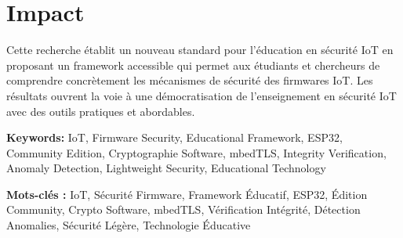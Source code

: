 \section*{Impact}

Cette recherche établit un nouveau standard pour l'éducation en sécurité IoT en proposant un framework accessible qui permet aux étudiants et chercheurs de comprendre concrètement les mécanismes de sécurité des firmwares IoT. Les résultats ouvrent la voie à une démocratisation de l'enseignement en sécurité IoT avec des outils pratiques et abordables.

\textbf{Keywords:} IoT, Firmware Security, Educational Framework, ESP32, Community Edition, Cryptographie Software, mbedTLS, Integrity Verification, Anomaly Detection, Lightweight Security, Educational Technology

\vfill

\begin{center}
\textbf{Mots-clés :} IoT, Sécurité Firmware, Framework Éducatif, ESP32, Édition Community, Crypto Software, mbedTLS, Vérification Intégrité, Détection Anomalies, Sécurité Légère, Technologie Éducative
\end{center}